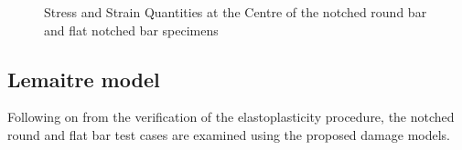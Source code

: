 \documentclass[sn-mathphys,Numbered,draft]{sn-jnl}%
\begin{document}
\begin{figure}[htbp]
		\caption{Stress and Strain Quantities at the Centre of the notched round bar and flat notched bar specimens}
	\label{fig:stressStrainCentre}
\end{figure}
\FloatBarrier








%		
%		
%		
\FloatBarrier



\subsection{Lemaitre model}
Following on from the verification of the elastoplasticity procedure, the notched round and flat bar test cases are examined using the proposed damage models.

\end{document}

